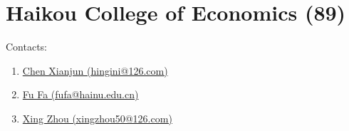 


\section{Haikou College of Economics (89)}
\label{sec:HKC}

Contacts:\begin{enumerate}
 \item {}\href{mailto:hingini@126.com}{Chen Xianjun (hingini@126.com)}
 \item {}\href{mailto:fufa@hainu.edu.cn}{Fu Fa (fufa@hainu.edu.cn)}
 \item {}\href{mailto:xingzhou50@126.com}{Xing Zhou (xingzhou50@126.com)}
\end{enumerate}


